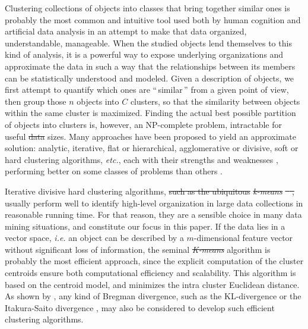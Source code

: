 \documentclass[natbib,smallextended]{svjour3}
\providecommand{\DIFaddtex}[1]{{\protect\color{blue}\uwave{#1}}} %
\providecommand{\DIFdeltex}[1]{{\protect\color{red}\sout{#1}}}                      %
\providecommand{\DIFaddbegin}{} %
\providecommand{\DIFaddend}{} %
\providecommand{\DIFdelbegin}{} %
\providecommand{\DIFdelend}{} %
\providecommand{\DIFadd}[1]{\texorpdfstring{\DIFaddtex{#1}}{#1}} %
\providecommand{\DIFdel}[1]{\texorpdfstring{\DIFdeltex{#1}}{}} %
\begin{document}
Clustering collections of objects into classes that bring together similar ones is probably the most common and intuitive tool used both by human cognition and artificial data analysis in an attempt to make that data organized, understandable, manageable. When the studied objects lend themselves to this kind of analysis, it is a powerful way to expose underlying organizations and approximate the data in such a way that the relationships between its members can be statistically understood and modeled. Given a description of objects, we first attempt to quantify which ones are ``\,similar\,'' from a given point of view, then group those $n$ objects into $C$ clusters, so that the similarity between objects within the same cluster is maximized. Finding the actual best possible partition of objects into clusters is, however, an NP-complete problem, intractable for useful \DIFdelbegin \DIFdel{data }\DIFdelend \DIFaddbegin \DIFadd{datasets }\DIFaddend sizes. Many approaches have been proposed to yield an approximate solution: analytic, iterative, flat or hierarchical, agglomerative or divisive, soft or hard clustering algorithms, \textit{etc.}, each with their strengths and weaknesses \citep{jain2010data}, performing better on some classes of problems than others \citep{steinbach2000comparison,thalamuthu2006evaluation}.

Iterative divisive hard clustering algorithms, \DIFdelbegin \DIFdel{such as the ubiquitous }\emph{\DIFdel{k-means}} %
\DIFdel{\mbox{%
\citep{macQueenBsmsp67}}%
, }\DIFdelend usually perform well to identify high-level organization in large data collections in reasonable running time. For that reason, they are a sensible choice in many data mining situations, and constitute our focus in this paper.
If the data lies in a vector space, \textit{i.e.} an object can be described by a $m$-dimensional feature vector without significant loss of information, the seminal \emph{\DIFdelbegin \DIFdel{K-means}\DIFdelend \DIFaddbegin \DIFadd{k-means}\DIFaddend } algorithm \citep{macQueenBsmsp67} is probably the most efficient approach, since the explicit computation of the cluster centroids ensure both computational efficiency and scalability. This algorithm is  based on the centroid model, and minimizes the intra cluster Euclidean distance. As shown by \citet{Banerjee:2005:CBD:1046920.1194902}, any kind of Bregman divergence, such as the KL-divergence \citep{Dhillon:2003:DIT:944919.944973} or the Itakura-Saito divergence \citep{linde:algorithm}, may also be considered to develop such efficient clustering algorithms.
\end{document}
